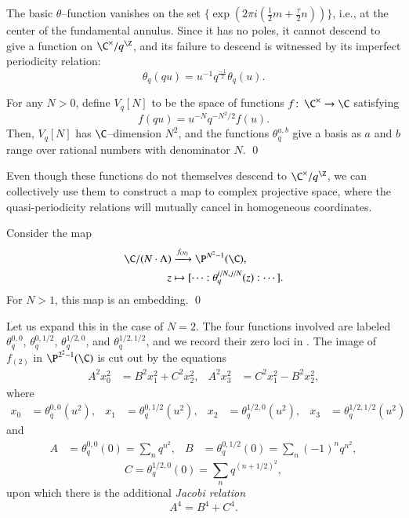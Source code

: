 The basic $\theta$--function vanishes on the set $\{\exp(2 \pi i (\frac{1}{2}m + \frac{\tau}{2}n))\}$, i.e., at the center of the fundamental annulus.  Since it has no poles, it cannot descend to give a function on $\C^\times / q^{\Z}$, and its failure to descend is witnessed by its imperfect periodicity relation: \[\theta_q(qu) = u^{-1} q^{\frac{-1}{2}} \theta_q(u).\]

\begin{lemma}
For any $N > 0$, define $V_q[N]$ to be the space of functions $f\co \C^\times \to \C$ satisfying \[f(q u) = u^{-N}  q^{-N^2/2} f(u).\]  Then, $V_q[N]$ has $\C$--dimension $N^2$, and the functions $\theta_q^{a, b}$ give a basis as $a$ and $b$ range over rational numbers with denominator $N$. \qed
\end{lemma}

Even though these functions do not themselves descend to $\C^\times / q^{\Z}$, we can collectively use them to construct a map to complex projective space, where the quasi-periodicity relations will mutually cancel in homogeneous coordinates.
\begin{theorem}
Consider the map
\begin{align*}
\C / (N \cdot \Lambda) & \xrightarrow{f_{(N)}} \P^{N^2-1}(\C), \\
z & \mapsto [\cdots : \theta_q^{i/N, j/N}(z) : \cdots].
\end{align*}
For $N > 1$, this map is an embedding. \qed
\end{theorem}

\begin{example}
Let us expand this in the case of $N = 2$.  The four functions involved are labeled $\theta_q^{0,0}$, $\theta_q^{0,1/2}$, $\theta_q^{1/2,0}$, and $\theta_q^{1/2,1/2}$, and we record their zero loci in .  The image of $f_{(2)}$ in $\P^{2^2 - 1}(\C)$ is cut out by the equations
\begin{align*}
A^2 x_0^2 & = B^2 x_1^2 + C^2 x_2^2, &
A^2 x_3^2 & = C^2 x_1^2 - B^2 x_2^2,
\end{align*}
where
\begin{align*}
x_0 & = \theta_q^{0, 0}(u^2), &
x_1 & = \theta_q^{0, 1/2}(u^2), &
x_2 & = \theta_q^{1/2, 0}(u^2), &
x_3 & = \theta_q^{1/2, 1/2}(u^2)
\end{align*}
and
\begin{align*}
A & = \theta_q^{0, 0}(0) = \sum_n q^{n^2}, &
B & = \theta_q^{0, 1/2}(0) = \sum_n (-1)^n q^{n^2},
\end{align*}
\[C = \theta_q^{1/2, 0}(0) = \sum_n q^{(n + 1/2)^2},\]
upon which there is the additional \textit{Jacobi relation} \[A^4 = B^4 + C^4.\]
\end{example}

